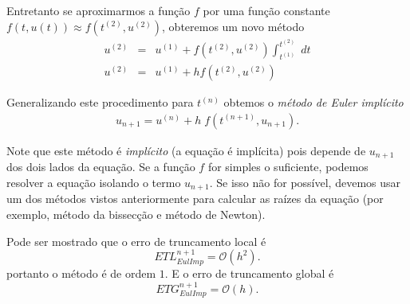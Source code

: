 Entretanto se aproximarmos a função $f$ por uma função constante $f(t,u(t)) \approx  f(t^{(2)},u^{(2)})$, obteremos um novo método
\begin{eqnarray}
  u^{(2)} &=&  u^{(1)} + f(t^{(2)},u^{(2)}) \int _{t^{(1)}}^{t^{(2)}}  \; dt \\
  u^{(2)} &=&  u^{(1)} + h f(t^{(2)},u^{(2)})
\end{eqnarray}


Generalizando este procedimento para $t^{(n)}$ obtemos o \emph{método de Euler implícito}
\begin{eqnarray}
u_{n+1}=u^{(n)} + h\;f(t^{(n+1)},u_{n+1}).
\end{eqnarray}

Note que este método é \emph{implícito} (a equação é implícita) pois depende de $u_{n+1}$ dos dois lados da equação. Se a função $f$ for simples o suficiente, podemos resolver a equação isolando o termo $u_{n+1}$. Se isso não for possível, devemos usar um dos métodos vistos anteriormente para calcular as raízes da equação (por exemplo, método da bissecção e método de Newton).



Pode ser mostrado que o erro de truncamento local é
\begin{equation} ETL_{EulImp}^{n+1}= \mathcal{O}(h^2). \end{equation}
portanto o método é de ordem $1$. E o erro de truncamento global é
\begin{equation} ETG_{EulImp}^{n+1}= \mathcal{O}(h). \end{equation}



